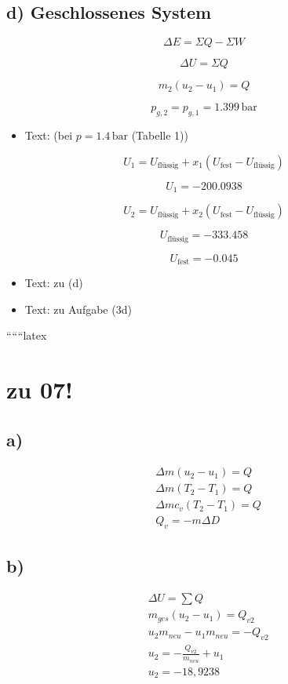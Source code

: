 \subsection*{d) Geschlossenes System}

\[
\Delta E = \Sigma Q - \Sigma W
\]

\[
\Delta U = \Sigma Q
\]

\[
m_2 (u_2 - u_1) = Q
\]

\[
p_{g,2} = p_{g,1} = 1.399 \, \text{bar}
\]

\begin{itemize}
    \item Text: (bei $p = 1.4 \, \text{bar}$ (Tabelle 1))
\end{itemize}

\[
U_1 = U_\text{flüssig} + x_1 (U_\text{fest} - U_\text{flüssig})
\]

\[
U_1 = -200.0938
\]

\[
U_2 = U_\text{flüssig} + x_2 (U_\text{fest} - U_\text{flüssig})
\]

\[
U_\text{flüssig} = -333.458
\]

\[
U_\text{fest} = -0.045
\]

\begin{itemize}
    \item Text: zu (d)
    \item Text: zu Aufgabe (3d)
\end{itemize}

``````latex


\section*{zu 07!}

\subsection*{a)}
\begin{align*}
    &\Delta m (u_2 - u_1) = Q \\
    &\Delta m (T_2 - T_1) = Q \\
    &\Delta m c_v (T_2 - T_1) = Q \\
    &Q_v = -m \Delta D
\end{align*}

\subsection*{b)}
\begin{align*}
    &\Delta U = \sum Q \\
    &m_{ges} (u_2 - u_1) = Q_{v2} \\
    &u_2 m_{neu} - u_1 m_{neu} = -Q_{v2} \\
    &u_2 = -\frac{Q_{v2}}{m_{neu}} + u_1 \\
    &u_2 = -18,9238
\end{align*}

